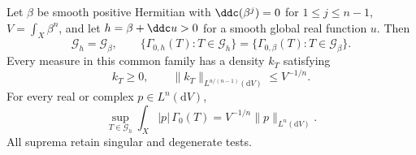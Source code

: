 \begin{theorem}\label{thm:constant-mass-entire-determinant-profile}
Let $\beta$ be smooth positive Hermitian with
$\ddc(\beta^j)=0$ for $1\leq j\leq n-1$,
$V=\int_X\beta^n$, and let $h=\beta+\ddc u>0$ for a smooth
global real function $u$. Then
\[
 \mathscr G_h=\mathscr G_\beta,\qquad
 \{\Gamma_{0,h}(T):T\in\mathscr G_h\}
 =\{\Gamma_{0,\beta}(T):T\in\mathscr G_\beta\}.
\]
Every measure in this common family has a density $k_T$ satisfying
\[
 k_T\geq0,\qquad
 \|k_T\|_{L^{n/(n-1)}(\mathrm dV)}\leq V^{-1/n}.
\]
For every real or complex $p\in L^n(\mathrm dV)$,
\begin{equation}\label{eq:constant-mass-determinant-profile}
 \sup_{T\in\mathscr G_h}\int_X|p|\,\Gamma_0(T)
       =V^{-1/n}\|p\|_{L^n(\mathrm dV)}.
\end{equation}
All suprema retain singular and degenerate tests.
\end{theorem}
